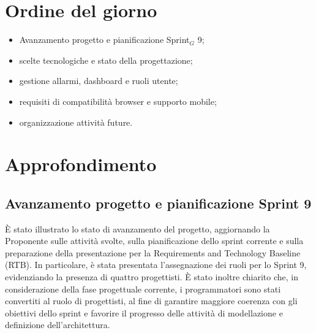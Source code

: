 \documentclass[10pt, letterpaper]{article}
\begin{document}
\makeTitlePage

\newpage

\tableofcontents

\newpage


\makeMeetingParticipantsTable

\section{Ordine del giorno}
\begin{itemize}
  \item Avanzamento progetto e pianificazione Sprint$_G$ 9;
  \item scelte tecnologiche e stato della progettazione;
  \item gestione allarmi, dashboard e ruoli utente;
  \item requisiti di compatibilità browser e supporto mobile;
  \item organizzazione attività future.

\end{itemize}

\section{Approfondimento}

\subsection{Avanzamento progetto e pianificazione Sprint 9}
È stato illustrato lo stato di avanzamento del progetto, aggiornando la Proponente sulle attività svolte, sulla pianificazione dello sprint corrente e sulla preparazione della presentazione per la Requirements and Technology Baseline (RTB). In particolare, è stata presentata l'assegnazione dei ruoli per lo Sprint 9, evidenziando la presenza di quattro progettisti.
\noindent
È stato inoltre chiarito che, in considerazione della fase progettuale corrente, i programmatori sono stati convertiti al ruolo di progettisti, al fine di garantire maggiore coerenza con gli obiettivi dello sprint e favorire il progresso delle attività di modellazione e definizione dell’architettura.
\end{document}
